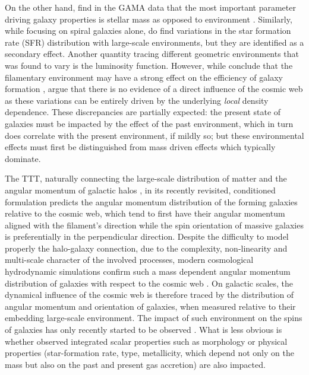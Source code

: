 \documentclass[useAMS,usenatbib]{mnras}
\begin{document}
On the other hand, \cite{Alpaslan2015} find in the GAMA data
that the most important parameter driving galaxy properties is stellar mass as opposed to environment \citep[see also,][]{Robotham2013}. 
Similarly, while focusing on spiral galaxies alone, \cite{Alpaslan2016} do find variations in the star formation rate (SFR) distribution with large-scale environments, but they are identified as a secondary  effect.
Another quantity tracing different geometric environments that was found to vary is the luminosity function. However, while \cite{Guo2015} conclude that the filamentary environment may have a strong effect on the efficiency of galaxy formation \citep[see also][]{Benitez-Llambay2013},
\cite{Eardley2015} argue that there is no evidence of a direct influence of the cosmic web as these variations can be entirely driven by the underlying {\it local} density dependence.  
These discrepancies  are  partially expected:  the present state of galaxies must be impacted by the effect of the past environment, which  in turn does correlate with the present environment, if mildly so;  but these environmental effects must first be distinguished from mass driven effects which typically dominate.

The TTT, naturally connecting the large-scale distribution of matter and the angular momentum of galactic halos \citep[e.g.][]{Jones1979,Barnes1987,Heavens1988,Porciani2002a,Porciani2002b,Lee2004},
in its recently revisited, conditioned formulation \citep[][]{Codis2015} predicts the angular momentum distribution of the forming galaxies relative to the cosmic web, which tend to first have their angular momentum aligned with the filament's direction while the spin orientation of massive galaxies is preferentially in the perpendicular direction.
Despite the difficulty to model properly the halo-galaxy connection, due to the complexity, non-linearity and multi-scale character of the involved processes, modern cosmological hydrodynamic simulations confirm such a mass dependent angular momentum distribution of galaxies with respect to the cosmic web \citep[][]{Dubois2014,Welker2014,Welker2017}. 
On galactic scales, the dynamical influence of the cosmic web is therefore traced by the distribution of angular momentum and orientation of galaxies, when measured relative to their embedding large-scale environment. The impact of such environment on the spins of galaxies has only recently started to be observed \citep[confirming the spin alignment for spirals and preferred perpendicular orientation for ellipticals][but see also \citealp{Jones2010,Cervantes-Sodi2010,AndraeJahnke2011} for  contradictory results]{Trujillo2006,LeeErdogdu2007,Paz2008,Tempel2013,Tempel2013b,Pahwa2016}.  
What is less obvious is whether observed integrated scalar properties such as morphology or physical properties (star-formation rate, type, metallicity, which depend not only on the mass but also on the past and present gas accretion) are also impacted.
\end{document}
